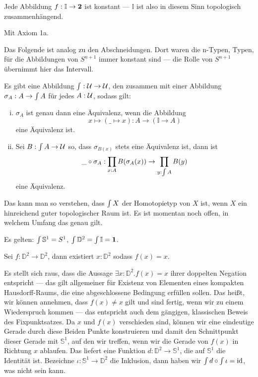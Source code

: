 \begin{bemerkung}
  Jede Abbildung \(f:\mathbb{I}\to \mathbf{2}\) ist konstant --- \(\mathbb{I}\) ist also in diesem Sinn topologisch zusammenhängend.
\end{bemerkung}

\begin{beweis}
  Mit Axiom 1a.
\end{beweis}

Das Folgende ist analog zu den Abschneidungen.
Dort waren die n-Typen, Typen, für die Abbildungen von \(S^{n+1}\) immer konstant sind --- die Rolle von \(S^{n+1}\) übernimmt hier das Intervall.

\begin{fakt}
  Es gibt eine Abbildung \(\operatorname{\int}:\mathcal{U}\to \mathcal{U}\), den  zusammen mit
  einer Abbildung \(\sigma_A:A\to \operatorname{\int} A\) für jedes \(A:\mathcal{U}\), sodass gilt:
  \begin{enumerate}[(i)]
  \item \(\sigma_A\) ist genau dann eine Äquivalenz, wenn die Abbildung
    \[
    x\mapsto (\_\mapsto x):A\to (\mathbb{I}\to A)
    \]
    eine Äquivalenz ist.
  \item Sei \(B:\operatorname{\int} A\to \mathcal{U}\) so, dass \(\sigma_{B(x)}\) stets eine Äquivalenz ist, dann ist
    \[
    \_\circ\sigma_A:\prod_{x:A}B(\sigma_A(x)) \to \prod_{y:\operatorname{\int} A}B(y)
    \]
    eine Äquivalenz.
  \end{enumerate}
\end{fakt}

Das kann man so verstehen, dass \(\operatorname{\int} X\) der Homotopietyp von \(X\) ist, wenn \(X\) ein hinreichend guter topologischer Raum ist. Es ist momentan noch offen, in welchem Umfang das genau gilt.

\begin{fakt}
  Es gelten: \(\operatorname{\int}\mathbb{S}^1=S^1\), \(\operatorname{\int} \mathbb{D}^2=\operatorname{\int} \mathbb I=\mathbf{1}\).
\end{fakt}

\begin{satz}
  Sei \(f:\mathbb{D}^2\to \mathbb{D}^2\), dann existiert \(x:\mathbb{D}^2\) sodass \(f(x)=x\).
\end{satz}

\begin{beweis}
  Es stellt sich raus, dass die Aussage \(\exists x:\mathbb{D}^2.f(x)=x\) ihrer doppelten Negation entspricht --- das gilt allgemeiner für Existenz von Elementen eines kompakten Hausdorff-Raums, die eine abgeschlossene Bedingung erfüllen sollen.
  Das heißt, wir können annehmen, dass \(f(x)\neq x\) gilt und sind fertig, wenn wir zu einem Wiederspruch kommen --- das entspricht auch dem gängigen, klassischen Beweis des Fixpunktsatzes.
  Da \(x\) und \(f(x)\) verschieden sind, können wir eine eindeutige Gerade durch diese Beiden Punkte konstruieren und damit den Schnittpunkt dieser Gerade mit \(\mathbb{S}^1\), auf den wir treffen, wenn wir die Gerade von \(f(x)\) in Richtung \(x\) ablaufen. Das liefert eine Funktion \(d:\mathbb{D}^2\to \mathbb{S}^1\), die auf \(\mathbb{S}^1\) die Identität ist.
  Bezeichne \(\iota:\mathbb{S}^1\to \mathbb{D}^2\) die Inklusion, dann haben wir
  \(\operatorname{\int} d\circ\operatorname{\int} \iota=\mathrm{id}\), was nicht sein kann.
\end{beweis}

